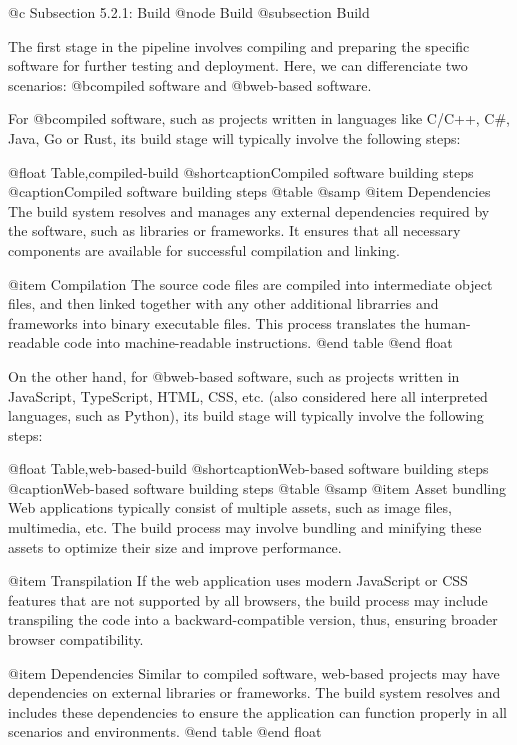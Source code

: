 @c Subsection 5.2.1: Build
@node Build
@subsection Build

The first stage in the pipeline involves compiling and preparing the specific software for further testing and deployment. Here, we can differenciate two scenarios: @b{compiled software} and @b{web-based software}.

For @b{compiled software}, such as projects written in languages like C/C++, C#, Java, Go or Rust, its build stage will typically involve the following steps:

@float Table,compiled-build
@shortcaption{Compiled software building steps}
@caption{Compiled software building steps}
@table @samp
@item Dependencies
The build system resolves and manages any external dependencies required by the software, such as libraries or frameworks. It ensures that all necessary components are available for successful compilation and linking.

@item Compilation
The source code files are compiled into intermediate object files, and then linked together with any other additional librarries and frameworks into binary executable files. This process translates the human-readable code into machine-readable instructions.
@end table
@end float

On the other hand, for @b{web-based software}, such as projects written in JavaScript, TypeScript, HTML, CSS, etc. (also considered here all interpreted languages, such as Python), its build stage will typically involve the following steps:

@float Table,web-based-build
@shortcaption{Web-based software building steps}
@caption{Web-based software building steps}
@table @samp
@item Asset bundling
Web applications typically consist of multiple assets, such as image files, multimedia, etc. The build process may involve bundling and minifying these assets to optimize their size and improve performance.

@item Transpilation
If the web application uses modern JavaScript or CSS features that are not supported by all browsers, the build process may include transpiling the code into a backward-compatible version, thus, ensuring broader browser compatibility.

@item Dependencies
Similar to compiled software, web-based projects may have dependencies on external libraries or frameworks. The build system resolves and includes these dependencies to ensure the application can function properly in all scenarios and environments.
@end table
@end float
